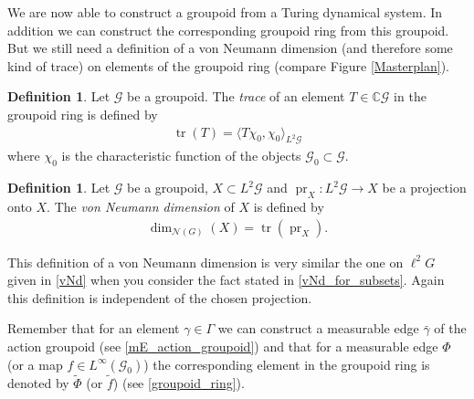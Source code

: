 \documentclass[12pt,a4paper]{scrartcl}
\theoremstyle{plain}
\theoremstyle{definition}
\newtheorem{Definition}[Theorem]{Definition}
\numberwithin{equation}{section}
\newcommand{\C}{\mathbb{C}} %
\newcommand{\2}{\mathbb{Z} / 2 \mathbb{Z}}
\newcommand{\G}{\mathcal{G}}
\newcommand{\1}{\bar{1}}
\newcommand{\0}{\bar{0}}
\newcommand{\tr}{\operatorname{tr}}
\newcommand{\pr}{\operatorname{pr}}
\begin{document}
We are now able to construct a groupoid from a Turing dynamical system. In addition we can construct the corresponding groupoid ring from this groupoid. But we still need a definition of a von Neumann dimension (and therefore some kind of trace) on elements of the groupoid ring (compare Figure \ref{Masterplan}).
\begin{Definition}
	Let $\G$ be a groupoid. The \emph{trace} of an element $T \in \C \G$ in the groupoid ring is defined by
	\begin{align*}
		\tr(T) = \langle T \chi_0, \chi_0 \rangle_{L^2 \G}
	\end{align*}
	where $\chi_0$ is the characteristic function of the objects $\G_0 \subset \G$.
\end{Definition}
\begin{Definition} \label{vNd_of_groupoids}
	Let $\G$ be a groupoid, $X \subset L^2 \G$ and $\pr_X\colon L^2 \G \to X$ be a projection onto $X$. The \emph{von Neumann dimension} of $X$ is defined by
	\begin{align*}
		\dim_{\mathcal{N}(G)}(X) = \tr(\pr_X).
	\end{align*}
\end{Definition}
This definition of a von Neumann dimension is very similar the one on $\ell^2 G$ given in \ref{vNd} when you consider the fact stated in \ref{vNd_for_subsets}. Again this definition is independent of the chosen projection. 

Remember that for an element $\gamma \in \Gamma$ we can construct a measurable edge $\bar{\gamma}$ of the action groupoid (see \ref{mE_action_groupoid}) and that for a measurable edge $\Phi$ (or a map $f \in L^\infty (\G_0)$) the corresponding element in the groupoid ring is denoted by $\tilde{\Phi}$ (or $\tilde{f}$) (see \ref{groupoid_ring}).
\end{document}
